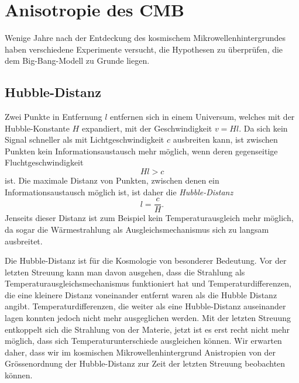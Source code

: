 \section{Anisotropie des CMB}
Wenige Jahre nach der Entdeckung des kosmischem Mikrowellenhintergrundes
haben verschiedene Experimente versucht, die Hypothesen zu überprüfen,
die dem Big-Bang-Modell zu Grunde liegen.


\subsection{Hubble-Distanz}
Zwei Punkte in Entfernung $l$ entfernen sich in einem Universum, welches
mit der Hubble-Konstante $H$ expandiert, mit der Geschwindigkeit
$v=Hl$.
Da sich kein Signal schneller als mit Lichtgeschwindigkeit $c$ ausbreiten
kann, ist zwischen Punkten kein Informationsaustausch mehr möglich,
wenn deren gegenseitige Fluchtgeschwindigkeit
\[
Hl > c
\]
ist.
Die maximale Distanz von Punkten, zwischen denen ein Informationsaustausch
möglich ist, ist daher die {\em Hubble-Distanz}
\begin{equation}
l = \frac{c}{H}.
\end{equation}
Jenseits dieser Distanz ist zum Beispiel kein Temperaturausgleich mehr
möglich, da sogar die Wärmestrahlung als Ausgleichsmechanismus sich zu
langsam ausbreitet.

Die Hubble-Distanz ist für die Kosmologie von besonderer Bedeutung.
Vor der letzten Streuung kann man davon ausgehen, dass die Strahlung
als Temperaturausgleichsmechanismus funktioniert hat und Temperaturdifferenzen,
die eine kleinere Distanz voneinander entfernt waren als die Hubble Distanz
angibt.
Temperaturdifferenzen, die weiter als eine Hubble-Distanz auseinander lagen
konnten jedoch nicht mehr ausgeglichen werden.
Mit der letzten Streuung entkoppelt sich die Strahlung von der Materie,
jetzt ist es erst recht nicht mehr möglich, dass sich Temperaturunterschiede
ausgleichen können.
Wir erwarten daher, dass wir im kosmischen Mikrowellenhintergrund
Anistropien von der Grössenordnung der Hubble-Distanz zur Zeit der
letzten Streuung beobachten können.

